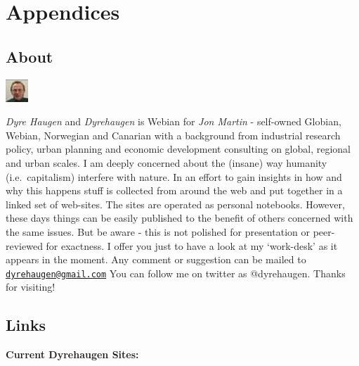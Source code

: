 \documentclass[
]{book}
\begin{document}
\hypertarget{part-appendices}{%
\part{Appendices}\label{part-appendices}}

\hypertarget{appendix-appendices}{%
\appendix}


\hypertarget{about}{%
\chapter{About}\label{about}}

\includegraphics{fig/me.jpg}

\emph{Dyre Haugen} and \emph{Dyrehaugen} is Webian for \emph{Jon Martin} -
self-owned Globian, Webian, Norwegian and Canarian with
a background from industrial research policy, urban planning and
economic development consulting on global, regional and urban scales.
I am deeply concerned about the (insane) way
humanity (i.e.~capitalism) interfere with nature.
In an effort to gain insights in how and why this happens
stuff is collected from around the web and put together
in a linked set of web-sites.
The sites are operated as personal notebooks.
However, these days things can be easily published to the
benefit of others concerned with the same issues.
But be aware - this is not polished for presentation or
peer-reviewed for exactness.
I offer you just to have a look at my `work-desk' as it appears in the moment.
Any comment or suggestion can be mailed to \href{mailto:dyrehaugen@gmail.com}{\nolinkurl{dyrehaugen@gmail.com}}
You can follow me on twitter as @dyrehaugen.
Thanks for visiting!

\hypertarget{links}{%
\chapter{Links}\label{links}}

\textbf{Current Dyrehaugen Sites:}
\end{document}
